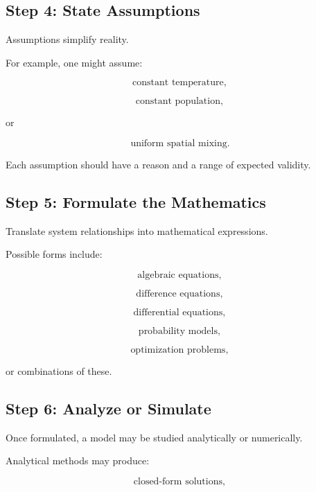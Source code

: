 \subsection{Step 4: State Assumptions}
\label{subsec:model-assumption-selection}

Assumptions simplify reality.

For example, one might assume:

\[
\boxed{
\text{constant temperature},
}
\]

\[
\boxed{
\text{constant population},
}
\]

or

\[
\boxed{
\text{uniform spatial mixing}.
}
\]

Each assumption should have a reason and a range of expected validity.

\subsection{Step 5: Formulate the Mathematics}
\label{subsec:model-formulate-math}

Translate system relationships into mathematical expressions.

Possible forms include:

\[
\boxed{
\text{algebraic equations},
}
\]

\[
\boxed{
\text{difference equations},
}
\]

\[
\boxed{
\text{differential equations},
}
\]

\[
\boxed{
\text{probability models},
}
\]

\[
\boxed{
\text{optimization problems},
}
\]

or combinations of these.

\subsection{Step 6: Analyze or Simulate}
\label{subsec:model-analysis-simulation}

Once formulated, a model may be studied analytically or numerically.

Analytical methods may produce:

\[
\boxed{
\text{closed-form solutions},
}
\]

